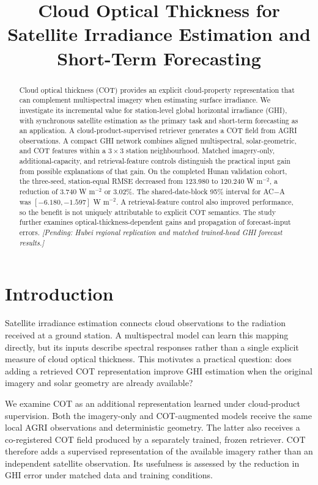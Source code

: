 \documentclass[11pt]{article}
\title{Cloud Optical Thickness for Satellite Irradiance Estimation and Short-Term Forecasting}
\author{}
\date{}
\newcommand{\pending}[1]{\textit{[Pending: #1]}}
\begin{document}
\maketitle
\begin{abstract}
Cloud optical thickness (COT) provides an explicit cloud-property representation that can complement multispectral imagery when estimating surface irradiance. We investigate its incremental value for station-level global horizontal irradiance (GHI), with synchronous satellite estimation as the primary task and short-term forecasting as an application. A cloud-product-supervised retriever generates a COT field from AGRI observations. A compact GHI network combines aligned multispectral, solar-geometric, and COT features within a $3\times3$ station neighbourhood. Matched imagery-only, additional-capacity, and retrieval-feature controls distinguish the practical input gain from possible explanations of that gain. On the completed Hunan validation cohort, the three-seed, station-equal RMSE decreased from 123.980 to 120.240 W m$^{-2}$, a reduction of 3.740 W m$^{-2}$ or 3.02\%. The shared-date-block 95\% interval for AC$-$A was $[-6.180,-1.597]$ W m$^{-2}$. A retrieval-feature control also improved performance, so the benefit is not uniquely attributable to explicit COT semantics. The study further examines optical-thickness-dependent gains and propagation of forecast-input errors. \pending{Hubei regional replication and matched trained-head GHI forecast results.}
\end{abstract}
\section{Introduction}
Satellite irradiance estimation connects cloud observations to the radiation received at a ground station. A multispectral model can learn this mapping directly, but its inputs describe spectral responses rather than a single explicit measure of cloud optical thickness. This motivates a practical question: does adding a retrieved COT representation improve GHI estimation when the original imagery and solar geometry are already available?

We examine COT as an additional representation learned under cloud-product supervision. Both the imagery-only and COT-augmented models receive the same local AGRI observations and deterministic geometry. The latter also receives a co-registered COT field produced by a separately trained, frozen retriever. COT therefore adds a supervised representation of the available imagery rather than an independent satellite observation. Its usefulness is assessed by the reduction in GHI error under matched data and training conditions.
\end{document}
